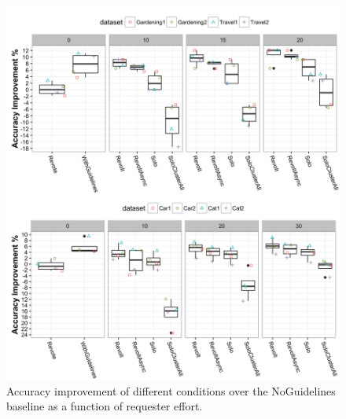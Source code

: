
\begin{figure}[ht]
	\centering
	\includegraphics[width=0.7\columnwidth]{Chapters/Revolt/figures/haccuracy2.png}
	\caption[
	Accuracy improvement as a function of requester effort. 
	]{
	Accuracy improvement of different conditions over the NoGuidelines baseline as a function of requester effort. 
	}
	\label{fig:accuracy}
\end{figure}


